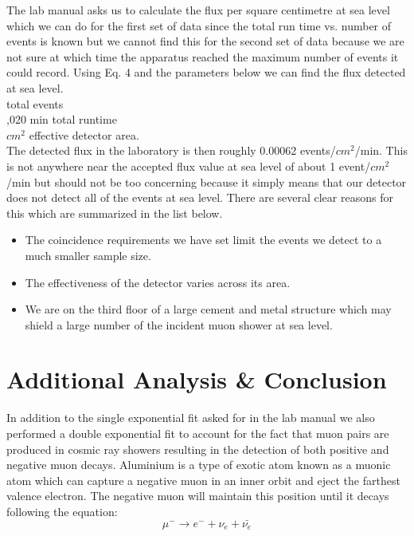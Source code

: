 \indent \indent The lab manual asks us to calculate the flux per square centimetre  at sea level which we can do for the first set of data since the total run time vs. number of events is known but we cannot find this for the second set of data because we are not sure at which time the apparatus reached the maximum number of events it could record.  Using Eq. 4 and the parameters below we can find the flux detected at sea level.\\
\indent{} total events \\
\indent {},020 min total runtime \\
\indent {}$ cm^2$ effective detector area. \\
The detected flux in the laboratory is  then roughly 0.00062 events/$cm^2$/min.  This is not anywhere near the accepted flux value at sea level of about 1 event/$cm^2$/min but should not be too concerning because it simply means that our detector does not detect all of the events at sea level. There are several clear reasons for this which are summarized in the list below.
\begin{itemize}
\item The coincidence requirements we have set limit the events we detect to a much smaller sample size. 
\item The effectiveness of the detector varies across its area.
\item We are on the third floor of a large cement and metal structure which may shield a large number of the incident muon shower at sea level. 
\end{itemize} 


\section{Additional Analysis \& Conclusion}
\indent \indent In addition to the single exponential fit asked for in the lab manual we also performed a double exponential fit to account for the fact that muon pairs are produced in cosmic ray showers resulting in the detection of both positive and negative muon decays. Aluminium is a type of exotic atom known as a muonic atom which can capture a negative muon in an inner orbit and eject the farthest valence electron.  The negative muon will maintain this position until it decays following the equation:
\begin{equation}
	\mu^- \rightarrow e^- + \nu_e + \bar{\nu_e}
\end{equation}

